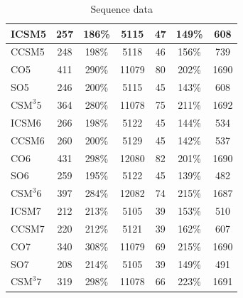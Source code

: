 \documentclass[12pt]{article}
\begin{document}
\begin{table}
\begin{tabular}{| l | c | c | c | c | c | c |}
    ICSM5 & 257 & 186\% & 5115 & 47 & 149\% & 608 \\\hline
    CCSM5 & 248 & 198\% & 5118 & 46 & 156\% & 739 \\\hline
    CO5 & 411 & 290\% & 11079 & 80 & 202\% & 1690 \\\hline
    SO5 & 246 & 200\% & 5115 & 45 & 143\% & 608 \\\hline
    $\text{CSM}^{3}5$ & 364 & 280\% & 11078 & 75 & 211\% & 1692 \\\hline\hline

    ICSM6 & 266 & 198\% & 5122 & 45 & 144\% & 534 \\\hline
    CCSM6 & 260 & 200\% & 5129 & 45 & 142\% & 537 \\\hline
    CO6 & 431 & 298\% & 12080 & 82 & 201\% & 1690 \\\hline
    SO6 & 259 & 195\% & 5122 & 45 & 139\% & 482 \\\hline
    $\text{CSM}^{3}6$ & 397 & 284\% & 12082 & 74 & 215\% & 1687 \\\hline\hline

    ICSM7 & 212 & 213\% & 5105 & 39 & 153\% & 510 \\\hline
    CCSM7 & 220 & 212\% & 5121 & 39 & 162\% & 607 \\\hline
    CO7 & 340 & 308\% & 11079 & 69 & 215\% & 1690 \\\hline
    SO7 & 208 & 214\% & 5105 & 39 & 149\% & 491 \\\hline
    $\text{CSM}^{3}7$ & 319 & 298\% & 11078 & 66 & 223\% & 1691 \\\hline\hline

  \end{tabular}
\caption{Sequence data}
\label{tab:algoseq}
\end{table}
%
\end{document}
